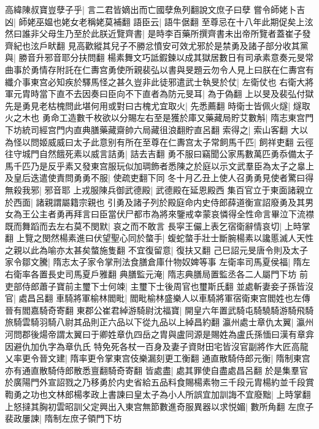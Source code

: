 高緯陳叔寶豈孽子乎|{
	言二君皆嫡出而亡國孽魚列翻說文庶子曰孽}
嘗令師姥卜吉凶|{
	師姥巫媪也姥女老稱姥莫補翻}
語臣云|{
	語牛倨翻}
至尊忌在十八年此期促矣上泫然曰誰非父母生乃至於此朕近覽齊書|{
	是時李百藥所撰齊書未出帝所覽者蓋崔子發齊紀也泫戶畎翻}
見高歡縱其兒子不勝忿憤安可效尤邪於是禁勇及諸子部分收其黨與|{
	勝音升邪音耶分扶問翻}
楊素舞文巧詆鍜鍊以成其獄居數日有司承素意奏元旻常曲事於勇情存附託在仁夀宫勇使所親裴弘以書與旻題云勿令人見上曰朕在仁夀宫有纖介事東宫必知疾於驛馬怪之甚久豈非此徒邪遣武士執旻於仗|{
	左衛仗也}
右衛大將軍元胄時當下直不去因奏曰臣向不下直者為防元旻耳|{
	為于偽翻}
上以旻及裴弘付獄先是勇見老枯槐問此堪何用或對曰古槐尤宜取火|{
	先悉薦翻}
時衛士皆佩火燧|{
	燧取火之木也}
勇命工造數千枚欲以分賜左右至是獲於庫又藥藏局貯艾數斛|{
	隋志東宫門下坊統司經宫門内直典膳藥藏齋帥六局藏徂浪翻貯直呂翻}
索得之|{
	索山客翻}
大以為怪以問姬威威曰太子此意别有所在至尊在仁夀宫太子常飼馬千匹|{
	飼祥吏翻}
云徑往守城門自然餓死素以威言詰勇|{
	詰去吉翻}
勇不服曰竊聞公家馬數萬匹勇忝備太子馬千匹乃是反乎素又發東宫服玩似加琱飾者悉陳之於庭以示文武羣臣為太子之辠上及皇后迭遣使責問勇勇不服|{
	使疏吏翻下同}
冬十月乙丑上使人召勇勇見使者驚曰得無殺我邪|{
	邪音耶}
上戎服陳兵御武德殿|{
	武德殿在延恩殿西}
集百官立于東面諸親立於西面|{
	諸親謂屬籍宗親也}
引勇及諸子列於殿庭命内史侍郎薛道衡宣詔廢勇及其男女為王公主者勇再拜言曰臣當伏尸都市為將來鑒戒幸蒙哀憐得全性命言畢泣下流襟既而舞蹈而去左右莫不閔默|{
	哀之而不敢言}
長寜王儼上表乞宿衛辭情哀切|{
	上時掌翻}
上覽之閔然楊素進曰伏望聖心同於螫手|{
	蝮蛇螫手壯士斷腕楊素以讒慝滅人天性之親以此為喻亦太甚矣螫施隻翻}
不宜復留意|{
	復扶又翻}
己巳詔元旻唐令則及太子家令鄒文騰|{
	隋志太子家令掌刑法食膳倉庫什物奴婢等事}
左衛率司馬夏侯福|{
	隋左右衛率各置長史司馬夏戶雅翻}
典膳監元淹|{
	隋志典膳局置監丞各二人屬門下坊}
前吏部侍郎蕭子寶前主璽下士何竦|{
	主璽下士後周官也璽斯氏翻}
並處斬妻妾子孫皆沒官|{
	處昌呂翻}
車騎將軍榆林閻毗|{
	閻毗榆林盛樂人以車騎將軍宿衛東宫閻姓也左傳晉有閻嘉騎奇寄翻}
東郡公崔君綽游騎尉沈福寶|{
	開皇六年置武騎屯騎驍騎游騎飛騎旅騎雲騎羽騎八尉其品則正六品以下從九品以上綽昌約翻}
瀛州處士章仇太翼|{
	瀛州河問郡後煬帝謂太翼曰于卿姓章仇四岳之胄與盧同源是賜姓為盧氏孫愐曰漢有章弇因避仇加仇字為章仇氏}
特免死各杖一百身及妻子資財田宅皆沒官副將作大匠高龍乂率更令晉文建|{
	隋率更令掌東宫伎樂漏刻更工衡翻}
通直散騎侍郎元衡|{
	隋制東宫亦有通直散騎侍郎散悉亶翻騎奇寄翻}
皆處盡|{
	處其罪使自盡處昌呂翻}
於是集羣官於廣陽門外宣詔戮之乃移勇於内史省給五品料食賜楊素物三千段元胄楊約並千段賞鞫勇之功也文林郎楊孝政上書諫曰皇太子為小人所誤宜加訓誨不宜廢黜|{
	上時掌翻}
上怒撻其胸初雲昭訓父定興出入東宫無節數進奇服異器以求悦媚|{
	數所角翻}
左庶子裴政屢諫|{
	隋制左庶子領門下坊}
